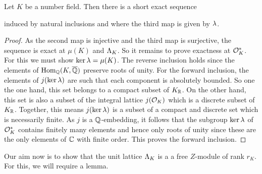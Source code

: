    \begin{proposition}\label{prop:exact_sequence_for_Dirichlets_unit_theorem}
      Let \(K\) be a number field. Then there is a short exact sequence

      \begin{center}
      \end{center}
      induced by natural inclusions and where the third map is given by \(\lambda\).
    \end{proposition}
    \begin{proof}
      As the second map is injective and the third map is surjective, the sequence is exact at \(\mu(K)\) and \(\Lambda_{K}\). So it remains to prove exactness at \(\mathcal{O}_{K}^{\ast}\). For this we must show \(\ker\lambda = \mu(K)\). The reverse inclusion holds since the elements of \(\operatorname{\mathrm{Hom}}_{\mathbb{Q}}(K,\overline{\mathbb{Q}})\) preserve roots of unity. For the forward inclusion, the elements of \(j(\ker\lambda)\) are such that each component is absolutely bounded. So one the one hand, this set belongs to a compact subset of \(K_{\mathbb{R}}\). On the other hand, this set is also a subset of the integral lattice \(j(\mathcal{O}_{K})\) which is a discrete subset of \(K_{\mathbb{R}}\). Together, this means \(j(\ker\lambda)\) is a subset of a compact and discrete set which is necessarily finite. As \(j\) is a \(\mathbb{Q}\)-embedding, it follows that the subgroup \(\ker\lambda\) of \(\mathcal{O}_{K}^{\ast}\) contains finitely many elements and hence only roots of unity since these are the only elements of \(\mathbb{C}\) with finite order. This proves the forward inclusion.
    \end{proof}

    Our aim now is to show that the unit lattice \(\Lambda_{K}\) is a a free \(Z\)-module of rank \(r_{K}\). For this, we will require a lemma.

